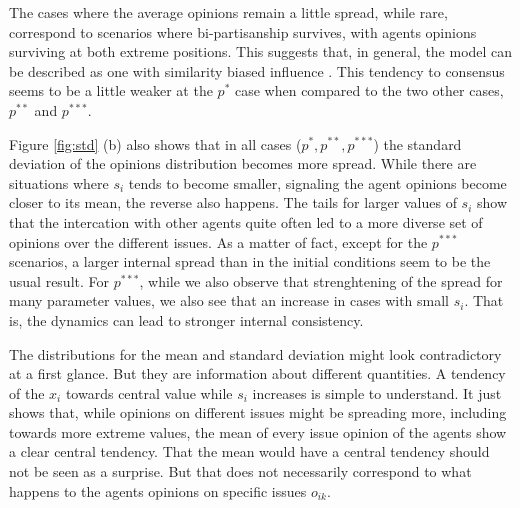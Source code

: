 \documentclass{article}
\begin{document}
The cases where the average opinions remain a little spread, while rare,
correspond to scenarios where bi-partisanship survives, with agents opinions
surviving at both extreme positions. This suggests that, in general, the model
can be described as one with similarity biased influence \cite{flache2017}. This
tendency to consensus seems to be a little weaker at the \(p^*\) case when
compared to the two other cases, $p^{**}$ and $p^{***}$.


Figure \ref{fig:std} (b) also shows that in all cases (\(p^{*}, p^{**},
p^{***}\)) the standard deviation of the opinions distribution becomes more
spread. While there are situations where $s_i$ tends to become smaller,
signaling the agent opinions become closer to its mean, the reverse also
happens. The tails for larger values of $s_i$ show that the intercation with
other agents quite often led to a more diverse set of opinions over the
different issues. As a matter of fact, except for the $p^{***}$ scenarios, a
larger internal spread than in the initial conditions seem to be the usual
result. For $p^{***}$, while we also observe that strenghtening of the spread
for many parameter values, we also see that an increase in cases with small
$s_i$. That is, the dynamics can lead to stronger internal consistency.

The distributions for the mean and standard deviation might look contradictory
at a first glance. But they are information about different quantities. A
tendency of the $x_i$ towards central value while $s_i$ increases is simple to
understand. It just shows that, while opinions on different issues might be
spreading more, including towards more extreme values, the mean of every issue
opinion of the agents show a clear central tendency. That the mean would have a
central tendency should not be seen as a surprise. But that does not necessarily
correspond to what happens to the agents  opinions on specific issues $o_{ik}$.
\end{document}
